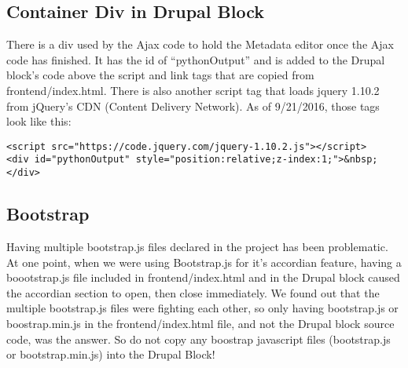 \documentclass[a4paper, 12pt]{article}
\begin{document}
\subsection{Container Div in Drupal Block}
\par\indent
There is a div used by the Ajax code to hold the Metadata editor once the Ajax code has finished. It has the id of ``pythonOutput'' and is added to the Drupal block's code above the script and link tags that are copied from frontend/index.html. There is also another script tag that loads jquery 1.10.2 from jQuery's CDN (Content Delivery Network). As of 9/21/2016, those tags look like this:
\begin{lstlisting}
<script src="https://code.jquery.com/jquery-1.10.2.js"></script>
<div id="pythonOutput" style="position:relative;z-index:1;">&nbsp;</div>
\end{lstlisting}

\subsection{Bootstrap}
\par\indent
Having multiple bootstrap.js files declared in the project has been problematic. At one point, when we were using Bootstrap.js for it's accordian feature, having a boootstrap.js file included in frontend/index.html and in the Drupal block caused the accordian section to open, then close immediately. We found out that the multiple bootstrap.js files were fighting each other, so only having bootstrap.js or boostrap.min.js in the frontend/index.html file, and not the Drupal block source code, was the answer. So do not copy any boostrap javascript files (bootstrap.js or bootstrap.min.js) into the Drupal Block!
\end{document}
